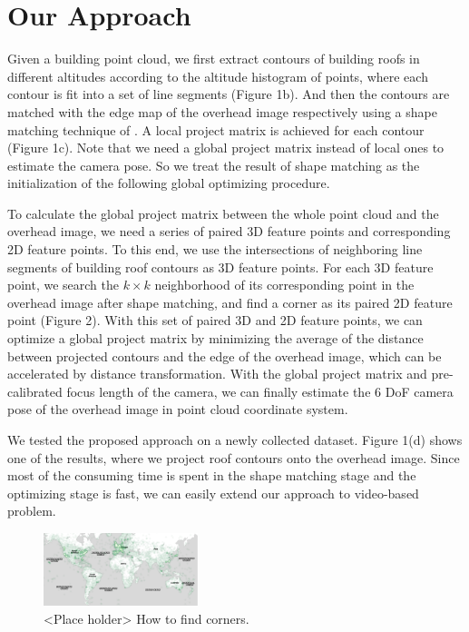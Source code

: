 \documentclass[sigconf,review,anonymous]{acmart}
\begin{document}
\section{Our Approach}
Given a building point cloud, we first extract contours of building roofs in different altitudes according to the altitude histogram of points, where each contour is fit into a set of line segments (Figure 1b). And then the contours are matched with the edge map of the overhead image respectively using a shape matching technique of \cite{FDCM}. A local project matrix is achieved for each contour (Figure 1c). Note that we need a global project matrix instead of local ones to estimate the camera pose. So we treat the result of shape matching as the initialization of the following global optimizing procedure. 

To calculate the global project matrix between the whole point cloud and the overhead image, we need a series of paired 3D feature points and corresponding 2D feature points. To this end, we use the intersections of neighboring line segments of building roof contours as 3D feature points. 
For each 3D feature point, we search the $k\times k$ neighborhood of its corresponding point in the overhead image after shape matching, and find a corner as its paired 2D feature point (Figure 2).
With this set of paired 3D and 2D feature points, we can optimize a global project matrix by minimizing the average of the distance between projected contours and the edge of the overhead image, which can be accelerated by distance transformation. With the global project matrix and pre-calibrated focus length of the camera, we can finally estimate the 6 DoF camera pose of the overhead image in point cloud coordinate system.

We tested the proposed approach on a newly collected dataset. Figure 1(d) shows one of the results, where we project roof contours onto the overhead image. Since most of the consuming time is spent in the shape matching stage and the optimizing stage is fast, we can easily extend our approach to video-based problem. 
 \begin{figure}
 	\centering
 	\vspace{2.0cm}
 	\includegraphics[width=0.4\textwidth]{map}
 	\caption{<Place holder> How to find corners.}
 	\label{fig:overview}
 \end{figure}

 
\end{document}

